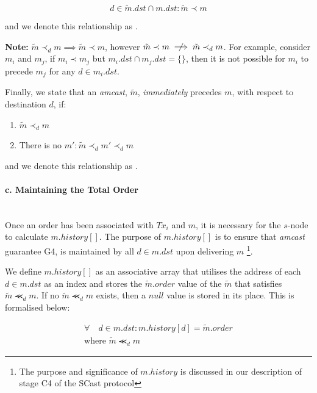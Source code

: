 \begin{enumerate}
        \begin{equation*}
            d \in \tilde{m}.dst \cap m.dst : \tilde{m} \prec m
        \end{equation*}
        
        and we denote this relationship as  .  
        
        \textbf{Note: } $\tilde{m} \prec_d m \implies  \tilde{m} \prec m$, however $\tilde{m} \prec m \centernot\implies \tilde{m} \prec_d m$.  For example, consider $m_i$ and $m_j$, if $m_i \prec m_j$ but $m_i.dst \cap m_j.dst = \{\}$, then it is not possible for $m_i$ to precede $m_j$ for any $d \in m_i.dst$.  
        
        Finally, we state that an \emph{amcast}, $\tilde{m}$, \emph{immediately} precedes $m$, with respect to destination $d$, if:

        \begin{enumerate}[label={(\roman*)}, leftmargin=5em]
            \item    $\tilde{m} \prec_d m$
            \item    There is no $m' : \tilde{m} \prec_d m' \prec_d m$
        \end{enumerate}
        
        and we denote this relationship as .  
        
        \paragraph{c. Maintaining the Total Order} \hfill \\
         Once an order has been associated with $Tx_i$ and $m$, it is necessary for the $s$-node to calculate $m.history[]$.  The purpose of $m.history[]$ is to ensure that \emph{amcast} guarantee G4, is maintained by all $d \in m.dst$ upon delivering $m$ \footnote{The purpose and significance of $m.history$ is discussed in our description of stage C4 of the \textsf{SCast} protocol}.  
         
         We define $m.history[]$ as an associative array that utilises the address of each $d \in m.dst$ as an index and stores the $\tilde{m}.order$ value of the $\tilde{m}$ that satisfies $\tilde{m} \llcurly_d m$.  If no $\tilde{m} \llcurly_d m$ exists, then a $null$ value is stored in its place.  This is formalised below:
         
         \begin{equation*}
             \begin{split}
	             \forall \quad d \in m.dst : m.history[d] = \tilde{m}.order \\
	             \text{where } \tilde{m} \llcurly_d m
             \end{split}
         \end{equation*}
         

\end{enumerate}
